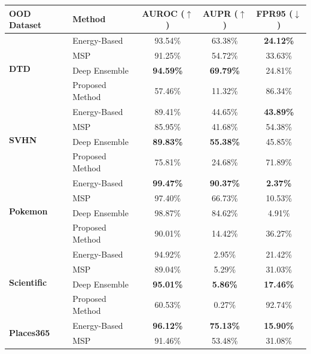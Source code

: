 \documentclass[oneside]{ctuthesis}
\begin{document}
\begin{table}[htbp]
    \centering
    \renewcommand{\arraystretch}{1.2}
    \begin{tabular}{@{}llccc@{}}
        \toprule
        \textbf{OOD Dataset} & \textbf{Method} & \textbf{AUROC ($\uparrow$)} & \textbf{AUPR ($\uparrow$)} & \textbf{FPR95 ($\downarrow$)} \\
        \midrule
        \multirow{4}{*}{\textbf{DTD}} 
        & Energy-Based       & 93.54\% & 63.38\% & \textbf{24.12\%} \\
        & MSP                & 91.25\% & 54.72\% & 33.63\% \\
        & Deep Ensemble      & \textbf{94.59\%} & \textbf{69.79\%} & 24.81\% \\
        & Proposed Method    & 57.46\% & 11.32\% & 86.34\% \\
        \midrule
        \multirow{4}{*}{\textbf{SVHN}} 
        & Energy-Based       & 89.41\% & 44.65\% & \textbf{43.89\%} \\
        & MSP                & 85.95\% & 41.68\% & 54.38\% \\
        & Deep Ensemble      & \textbf{89.83\%} & \textbf{55.38\%} & 45.85\% \\
        & Proposed Method    & 75.81\% & 24.68\% & 71.89\% \\
        \midrule
        \multirow{4}{*}{\textbf{Pokemon}} 
        & Energy-Based       & \textbf{99.47\%} & \textbf{90.37\%} & \textbf{2.37\%} \\
        & MSP                & 97.40\% & 66.73\% & 10.53\% \\
        & Deep Ensemble      & 98.87\% & 84.62\% & 4.91\% \\
        & Proposed Method    & 90.01\% & 14.42\% & 36.27\% \\
        \midrule
        \multirow{4}{*}{\textbf{Scientific}} 
        & Energy-Based       & 94.92\% & 2.95\% & 21.42\% \\
        & MSP                & 89.04\% & 5.29\% & 31.03\% \\
        & Deep Ensemble      & \textbf{95.01\%} & \textbf{5.86\%} & \textbf{17.46\%} \\
        & Proposed Method    & 60.53\% & 0.27\% & 92.74\% \\
        \midrule
        \multirow{4}{*}{\textbf{Places365}} 
        & Energy-Based       & \textbf{96.12\%} & \textbf{75.13\%} & \textbf{15.90\%} \\
        & MSP                & 91.46\% & 53.48\% & 31.08\% \\

\end{tabular}
\end{table}
\end{document}
